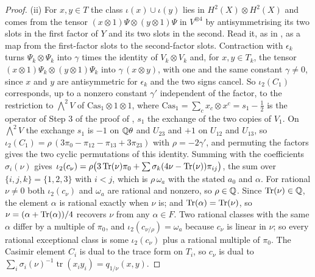 \begin{proof}
(ii) For $x,y\in T$ the class $\iota(x)\cup\iota(y)$ lies in
$H^{2}(X)\otimes H^{2}(X)$ and comes from the tensor
$(x\otimes1)\Psi\otimes(y\otimes1)\Psi$ in $V^{\otimes4}$ by antisymmetrising
its two slots in the first factor of $Y$ and its two slots in the second.
Read it, as in , as a map from the first-factor slots to
the second-factor slots. Contraction with $\epsilon_{k}$ turns
$\Psi_{k}\otimes\Psi_{k}$ into $\gamma$ times the identity of
$V_{k}\otimes V_{k}$ and, for $x,y\in T_{k}$, the tensor
$(x\otimes1)\Psi_{k}\otimes(y\otimes1)\Psi_{k}$ into $\gamma\,(x\otimes y)$,
with one and the same constant $\gamma\ne0$, since $x$ and $y$ are
antisymmetric for $\epsilon_{k}$ and the two signs cancel. So $\iota_{2}(C_{1})$
corresponds, up to a nonzero constant $\gamma'$ independent of the factor, to
the restriction to $\bigwedge^{2}V$ of $\mathrm{Cas}_{1}\otimes1\otimes1$,
where $\mathrm{Cas}_{1}=\sum_{c}x_{c}\otimes x^{c}=s_{1}-\frac12$ is the
operator of Step 3 of the proof of , $s_{1}$ the
exchange of the two copies of $V_{1}$. On $\bigwedge^{2}V$ the exchange
$s_{1}$ is $-1$ on $\mathbb{Q}\theta$ and $U_{23}$ and $+1$ on $U_{12}$ and $U_{13}$,
so $\iota_{2}(C_{1})=\rho\,(3\pi_{0}-\pi_{12}-\pi_{13}+3\pi_{23})$ with
$\rho=-2\gamma'$, and permuting the factors gives the two cyclic permutations
of this identity. Summing with the coefficients $\sigma_{i}(\nu)$ gives
$\iota_{2}(c_{\nu})=\rho\bigl(3\operatorname{Tr}(\nu)\pi_{0}+\sum\sigma_{k}(4\nu-\operatorname{Tr}(\nu))
\pi_{ij}\bigr)$, the sum over $\{i,j,k\}=\{1,2,3\}$ with $i<j$, which is
$\rho\,\omega_{a}$ with the stated $a_{0}$ and $\alpha$. For rational $\nu\ne0$
both $\iota_{2}(c_{\nu})$ and $\omega_{a}$ are rational and nonzero, so
$\rho\in\mathbb{Q}$. Since
$\operatorname{Tr}(\nu)\in\mathbb{Q}$, the element $\alpha$ is rational exactly when $\nu$ is; and
$\operatorname{Tr}(\alpha)=\operatorname{Tr}(\nu)$, so $\nu=(\alpha+\operatorname{Tr}(\alpha))/4$ recovers $\nu$ from
any $\alpha\in F$. Two rational classes with the same $\alpha$ differ by a
multiple of $\pi_{0}$, and $\iota_{2}(c_{\nu/\rho})=\omega_{a}$ because
$c_{\nu}$ is linear in $\nu$; so every rational exceptional class is some
$\iota_{2}(c_{\nu})$ plus a rational multiple of $\pi_{0}$. The Casimir element $C_{i}$ is dual to the trace form
on $T_{i}$, so $c_{\nu}$ is dual to $\sum_{i}\sigma_{i}(\nu)^{-1}
\operatorname{tr}(x_{i}y_{i})=q_{1/\nu}(x,y)$.


\end{proof}

